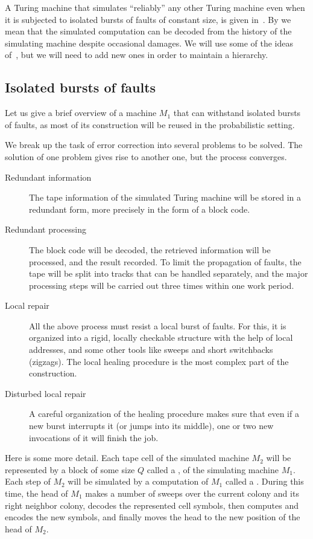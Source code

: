 \documentclass[11pt]{memoir}
\theoremstyle{definition} %
\newcommand{\Q}{Q}
\begin{document}
A Turing machine that simulates ``reliably'' any other
Turing machine even when it is subjected to isolated bursts of faults of constant size,
is given in~\cite{burstyTuring13}.
By  we mean that the simulated computation can be decoded from the history
of the simulating machine despite occasional damages.
We will use some of the ideas of~\cite{burstyTuring13}, but we will need to add new ones in
order to maintain a hierarchy.


\subsection{Isolated bursts of faults}\label{sec:bursts}

Let us give a brief overview of a machine \( M_{1} \) that
can withstand isolated bursts of faults, as most of its construction will be reused
in the probabilistic setting.

We break up the task of error correction into several 
problems to be solved.
The solution of one problem gives rise to another one, but the process converges.
\begin{description}
\item[Redundant information] The tape information of the simulated Turing machine
will be stored in a redundant form, more precisely in the form of a block code.
\item[Redundant processing] The block code will be decoded, the retrieved information 
will be processed, and the result recorded.
To limit the propagation of faults, the tape will be split
into tracks that can be handled separately, and the major processing steps will be 
carried out three times within one work period.
\item[Local repair] All the above process must resist a local burst of faults.
For this, it is organized into a rigid, locally checkable structure
with the help of local addresses, and some other tools like sweeps and 
short switchbacks (zigzags).
The local healing procedure is the most complex part of the construction.
\item[Disturbed local repair] A careful organization of the healing procedure
makes sure that even if a new burst interrupts it (or jumps into its middle),
one or two new invocations of it will finish the job.
\end{description}

Here is some more detail.
Each tape cell of the simulated machine \( M_{2} \) will be represented by a block of
some size \( \Q \) called a , of the simulating machine \( M_{1} \).
Each step of \( M_{2} \) will be simulated by a computation of \( M_{1} \) called
a .
During this time, the head of \( M_{1} \) makes a number of sweeps over the
current colony and its right neighbor colony, decodes the represented cell symbols,
then computes and encodes the new symbols, and finally moves the head 
to the new position of the head of \( M_{2} \).
\end{document}
